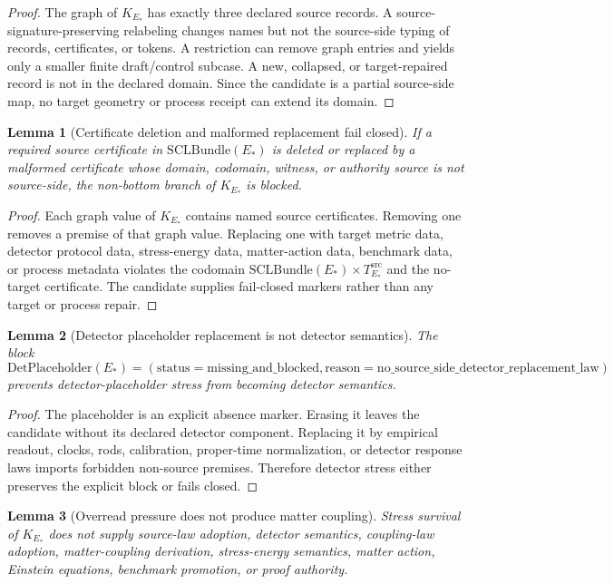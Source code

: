 \documentclass[11pt]{article}
\newcommand{\EStar}{E_{\ast}}
\newcommand{\SCLBundle}{\mathrm{SCLBundle}}
\newcommand{\DetPlaceholder}{\mathrm{DetPlaceholder}}
\newcommand{\KStar}{K_{E_{\ast}}}
\newcommand{\Src}{\mathrm{src}}
\newtheorem{lemma}{Lemma}
\begin{document}
\begin{proof}
The graph of \(\KStar\) has exactly three declared source records. A
source-signature-preserving relabeling changes names but not the source-side
typing of records, certificates, or tokens. A restriction can remove graph
entries and yields only a smaller finite draft/control subcase. A new,
collapsed, or target-repaired record is not in the declared domain. Since the
candidate is a partial source-side map, no target geometry or process receipt
can extend its domain.
\end{proof}

\begin{lemma}[Certificate deletion and malformed replacement fail closed]
If a required source certificate in \(\SCLBundle(\EStar)\) is deleted or
replaced by a malformed certificate whose domain, codomain, witness, or
authority source is not source-side, the non-bottom branch of \(\KStar\) is
blocked.
\end{lemma}

\begin{proof}
Each graph value of \(\KStar\) contains named source certificates. Removing
one removes a premise of that graph value. Replacing one with target metric
data, detector protocol data, stress-energy data, matter-action data,
benchmark data, or process metadata violates the codomain
\(\SCLBundle(\EStar)\times T_{\EStar}^{\Src}\) and the no-target certificate.
The candidate supplies fail-closed markers rather than any target or process
repair.
\end{proof}

\begin{lemma}[Detector placeholder replacement is not detector semantics]
The block
\[
  \DetPlaceholder(\EStar)=
  (\mathrm{status}=\mathrm{missing\_and\_blocked},
   \mathrm{reason}=\mathrm{no\_source\_side\_detector\_replacement\_law})
\]
prevents detector-placeholder stress from becoming detector semantics.
\end{lemma}

\begin{proof}
The placeholder is an explicit absence marker. Erasing it leaves the candidate
without its declared detector component. Replacing it by empirical readout,
clocks, rods, calibration, proper-time normalization, or detector response
laws imports forbidden non-source premises. Therefore detector stress either
preserves the explicit block or fails closed.
\end{proof}

\begin{lemma}[Overread pressure does not produce matter coupling]
Stress survival of \(\KStar\) does not supply source-law adoption, detector
semantics, coupling-law adoption, matter-coupling derivation, stress-energy
semantics, matter action, Einstein equations, benchmark promotion, or proof
authority.
\end{lemma}
\end{document}
